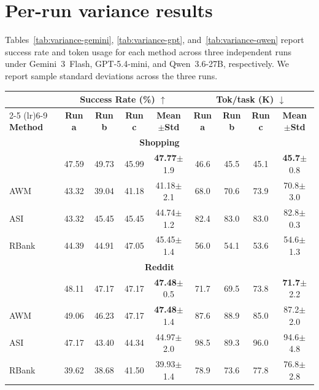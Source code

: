 \section{Per-run variance results}
\label{app:variance}

Tables~\ref{tab:variance-gemini}, \ref{tab:variance-gpt}, and~\ref{tab:variance-qwen} report success rate and token usage for each method across three independent runs under Gemini~3~Flash, GPT-5.4-mini, and Qwen~3.6-27B, respectively.
We report sample standard deviations across the three runs.

\begin{table}[ht]
\centering
\small
\begin{tabular}{lcccccccc}
\toprule
& \multicolumn{4}{c}{\textbf{Success Rate (\%) $\uparrow$}} & \multicolumn{4}{c}{\textbf{Tok/task (K) $\downarrow$}} \\
\cmidrule(lr){2-5} \cmidrule(lr){6-9}
\textbf{Method} & \textbf{Run a} & \textbf{Run b} & \textbf{Run c} & \textbf{Mean$\pm$Std} & \textbf{Run a} & \textbf{Run b} & \textbf{Run c} & \textbf{Mean$\pm$Std} \\
\midrule
\multicolumn{9}{c}{\textbf{Shopping}} \\
\midrule
\budgetactor{}      & 47.59 & 49.73 & 45.99 & \textbf{47.77}{\scriptsize $\pm$1.9} & 46.6 & 45.5 & 45.1 & \textbf{45.7}{\scriptsize $\pm$0.8} \\
AWM            & 43.32 & 39.04 & 41.18 & 41.18{\scriptsize $\pm$2.1} & 68.0 & 70.6 & 73.9 & 70.8{\scriptsize $\pm$3.0} \\
ASI            & 43.32 & 45.45 & 45.45 & 44.74{\scriptsize $\pm$1.2} & 82.4 & 83.0 & 83.0 & 82.8{\scriptsize $\pm$0.3} \\
RBank          & 44.39 & 44.91 & 47.05 & 45.45{\scriptsize $\pm$1.4} & 56.0 & 54.1 & 53.6 & 54.6{\scriptsize $\pm$1.3} \\
\midrule
\multicolumn{9}{c}{\textbf{Reddit}} \\
\midrule
\budgetactor{}      & 48.11 & 47.17 & 47.17 & \textbf{47.48}{\scriptsize $\pm$0.5} & 71.7 & 69.5 & 73.8 & \textbf{71.7}{\scriptsize $\pm$2.2} \\
AWM            & 49.06 & 46.23 & 47.17 & \textbf{47.48}{\scriptsize $\pm$1.4} & 87.6 & 88.9 & 85.0 & 87.2{\scriptsize $\pm$2.0} \\
ASI            & 47.17 & 43.40 & 44.34 & 44.97{\scriptsize $\pm$2.0} & 98.5 & 89.3 & 96.0 & 94.6{\scriptsize $\pm$4.8} \\
RBank          & 39.62 & 38.68 & 41.50 & 39.93{\scriptsize $\pm$1.4} & 78.9 & 73.6 & 77.8 & 76.8{\scriptsize $\pm$2.8} \\

\end{tabular}
\end{table}
